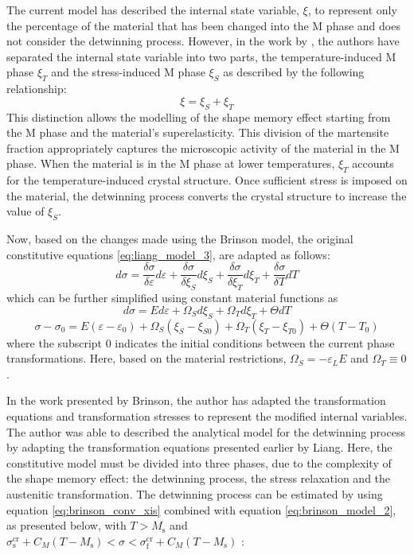 The current model has described the internal state variable, $\xi$, to represent only the percentage of the material that has been changed into the M phase and does not consider the detwinning process. However, in the work by \cite{brinsonOneDimensionalConstitutiveBehavior1993}, the authors have separated the internal state variable into two parts, the temperature-induced M phase $\xi_T$ and the stress-induced M phase $\xi_S$ as described by the following relationship:
\begin{equation}
  \label{eq:xis-xit}
  \xi = \xi_S + \xi_T
\end{equation}
This distinction allows the modelling of the shape memory effect starting from the M phase and the material's superelasticity. This division of the martensite fraction appropriately captures the microscopic activity of the material in the M phase. When the material is in the M phase at lower temperatures, $\xi_T$ accounts for the temperature-induced crystal structure. Once sufficient stress is imposed on the material, the detwinning process converts the crystal structure to increase the value of $\xi_S$.

Now, based on the changes made using the Brinson model, the original constitutive equations \cref{eq:liang_model_3}, are adapted as follows:
\begin{equation}
  \label{eq:brinson_model_1}
  d\sigma = \frac{\delta\sigma}{\delta\varepsilon}d\varepsilon + \frac{\delta\sigma}{\delta\xi_S}d\xi_S + \frac{\delta\sigma}{\delta\xi_T}d\xi_T + \frac{\delta\sigma}{\delta T}dT
\end{equation}
 which can be further simplified using constant material functions as
\begin{equation}
  \label{eq:brinson_model_2}
  d\sigma = Ed\varepsilon + \Omega_Sd\xi_S + \Omega_Td\xi_T + \Theta dT
\end{equation}
\begin{equation}
  \label{eq:brinson_model_3}
  \sigma-\sigma_0 = E(\varepsilon-\varepsilon_0) + \Omega_S(\xi_S-\xi_{S0}) + \Omega_T(\xi_T-\xi_{T0}) + \Theta (T-T_0)
\end{equation}
where the subscript $0$ indicates the initial conditions between the current phase transformations. Here, based on the material restrictions, $\Omega_S=-\varepsilon_L E$ and $\Omega_T\equiv0$.

In the work presented by Brinson, the author has adapted the transformation equations and transformation stresses to represent the modified internal variables. The author was able to described the analytical model for the detwinning process by adapting the transformation equations presented earlier by Liang. Here, the constitutive model must be divided into three phases, due to the complexity of the shape memory effect: the detwinning process, the stress relaxation and the austenitic transformation. The detwinning process can be estimated by using equation \ref{eq:brinson_conv_xis} combined with equation \ref{eq:brinson_model_2}, as presented below, with $T > M_\mathrm{s}$ and $\sigma_\mathrm{s}^\mathrm{cr} + C_M(T - M_\mathrm{s}) < \sigma < \sigma_\mathrm{f}^\mathrm{cr} + C_M(T-M_\mathrm{s})$ :

